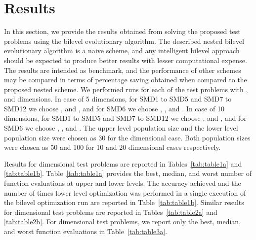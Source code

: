 \documentclass[twoside]{article}
\begin{document}
\section{Results}\label{sec:results}
In this section, we provide the results obtained from solving the proposed test problems using the bilevel evolutionary algorithm. The described nested bilevel evolutionary algorithm is a naive scheme, and any intelligent bilevel approach should be expected to produce better results with lesser computational expense. The results are intended as benchmark, and the performance of other schemes may be compared in terms of percentage saving obtained when compared to the proposed nested scheme. We performed  runs for each of the test problems with ,  and  dimensions. In case of 5 dimensions, for SMD1 to SMD5 and SMD7 to SMD12 we choose ,  and , and for SMD6 we choose , ,  and . In case of 10 dimensions, for SMD1 to SMD5 and SMD7 to SMD12 we choose ,  and , and for SMD6 we choose , ,  and . The upper level population size  and the lower level population size  were chosen as 30 for the  dimensional case. Both population sizes were chosen as 50 and 100 for 10 and 20 dimensional cases respectively.

Results for  dimensional test problems are reported in Tables~\ref{tab:table1a} and \ref{tab:table1b}. Table~\ref{tab:table1a} provides the best, median, and worst number of function evaluations at upper and lower levels. The accuracy achieved and the number of times lower level optimization was performed in a single execution of the bilevel optimization run are reported in Table~\ref{tab:table1b}. Similar results for  dimensional test problems are reported in Tables~\ref{tab:table2a} and \ref{tab:table2b}. For  dimensional test problems, we report only the best, median, and worst function evaluations in Table~\ref{tab:table3a}.
\end{document}
